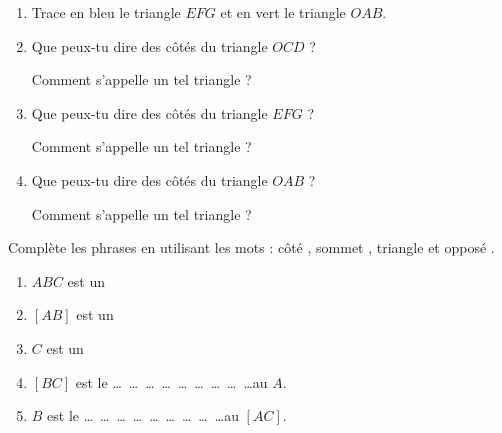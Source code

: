\documentclass[a4paper,10pt]{report}
\begin{document}
\begin{ex}
\begin{minipage}{8.5cm}
\begin{enumerate}
Comment s'appelle la figure obtenue ? 

Pour cette figure, comment s'appellent les points $O$, $C$ et $D$ ?
\item Trace en bleu le triangle $EFG$ et en vert le triangle $OAB$.
\item Que peux-tu dire des côtés du triangle $OCD$ ? 

Comment s'appelle un tel triangle ?
\item Que peux-tu dire des côtés du triangle $EFG$ ? 

Comment s'appelle un tel triangle ?
\item Que peux-tu dire des côtés du triangle $OAB$ ? 

Comment s'appelle un tel triangle ?
\end{enumerate}
\end{minipage}
\end{ex}

\begin{ex}
Complète les phrases en utilisant les mots : \og côté \fg{}, \og sommet \fg{}, \og  triangle \fg{} et \og opposé \fg{}.

\noindent \begin{minipage}{4cm}
\begin{center}
\end{center}
\end{minipage}
\hspace{5mm}
\begin{minipage}{11cm}
\begin{enumerate}\medskip
\item $ABC$ est un \dotfill\medskip
\item $[AB]$ est un \dotfill\medskip
\item $C$ est un \dotfill\medskip
\item $[BC]$ est le \dots ~\dots ~\dots ~\dots ~\dots ~\dots ~\dots ~\dots ~\dots au \dotfill $A$.\medskip
\item$ B$ est le \dots ~\dots ~\dots ~\dots ~\dots ~\dots ~\dots ~\dots ~\dots au \dotfill $[AC]$.
\end{enumerate}
\end{minipage}
\end{ex}
\end{document}
